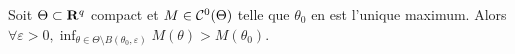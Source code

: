 	\begin{lem}
		Soit $\Theta \subset \mathbf{R}^q$ compact et $M \in \mathcal{C}^0(\Theta)$ telle que $\theta_0$ en est l'unique maximum.
		Alors $\forall \varepsilon > 0, \inf_{\theta \in \Theta \setminus B(\theta_0,\varepsilon)} M(\theta) > M(\theta_0)$.
	\end{lem}
